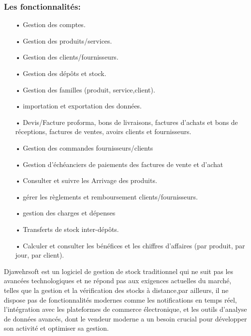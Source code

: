 \documentclass[edit,12pt,a4paper,ChapStyle,oneside,doubleinterligne]{report}
\begin{document}
\subsubsection{Les fonctionnalités:}
\begin{itemize}
    \item [•] Gestion des comptes. 
    \item [•] Gestion des produits/services.
    \item [•] Gestion des clients/fournisseurs.
    \item [•] Gestion des dépôts et stock.
    \item [•] Gestion des familles (produit, service,client).
    \item [•] importation et exportation des données.
    \item [•] Devis/Facture proforma, bons de livraisons, factures d'achats et bons de réceptions, factures de ventes, avoirs clients et fournisseurs.
    \item [•] Gestion des commandes fournisseurs/clients
    \item [•] Gestion d'échéanciers de paiements des factures de vente et d'achat
    \item [•] Consulter et suivre les Arrivage des produits.
    \item [•] gérer les règlements et remboursement clients/fournisseurs.
    \item [•] gestion des charges et dépenses
    \item [•] Transferts de stock inter-dépôts.
    \item [•] Calculer et consulter les bénéfices et les chiffres d'affaires (par produit, par jour, par client).
\end{itemize}
Djawehrsoft est un logiciel de gestion de stock traditionnel qui ne suit pas les avancées technologiques et ne répond pas aux exigences actuelles du marché, telles que la gestion et la vérification des stocks à distance,par ailleurs, il ne dispose pas de fonctionnalités modernes comme les notifications en temps réel, l'intégration avec les plateformes de commerce électronique, et les outils d'analyse de données avancés, dont le vendeur moderne a un besoin crucial pour développer son activité et optimiser sa gestion.
\end{document}
